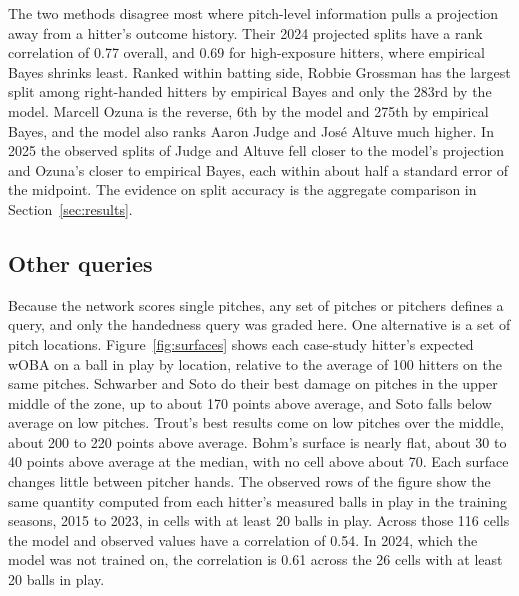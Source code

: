 \documentclass[11pt,letterpaper]{article}
\let\oldsubsection\subsection
\renewcommand\subsection{\FloatBarrier\oldsubsection}
\begin{document}
The two methods disagree most where pitch-level information pulls a projection away from a hitter's outcome history. Their 2024 projected splits have a rank correlation of 0.77 overall, and 0.69 for high-exposure hitters, where empirical Bayes shrinks least. Ranked within batting side, Robbie Grossman has the largest split among right-handed hitters by empirical Bayes and only the 283rd by the model. Marcell Ozuna is the reverse, 6th by the model and 275th by empirical Bayes, and the model also ranks Aaron Judge and José Altuve much higher. In 2025 the observed splits of Judge and Altuve fell closer to the model's projection and Ozuna's closer to empirical Bayes, each within about half a standard error of the midpoint. The evidence on split accuracy is the aggregate comparison in Section~\ref{sec:results}.

\subsection{Other queries}
\label{sec:otherqueries}

Because the network scores single pitches, any set of pitches or pitchers defines a query, and only the handedness query was graded here. One alternative is a set of pitch locations. Figure~\ref{fig:surfaces} shows each case-study hitter's expected wOBA on a ball in play by location, relative to the average of 100 hitters on the same pitches. Schwarber and Soto do their best damage on pitches in the upper middle of the zone, up to about 170 points above average, and Soto falls below average on low pitches. Trout's best results come on low pitches over the middle, about 200 to 220 points above average. Bohm's surface is nearly flat, about 30 to 40 points above average at the median, with no cell above about 70. Each surface changes little between pitcher hands. The observed rows of the figure show the same quantity computed from each hitter's measured balls in play in the training seasons, 2015 to 2023, in cells with at least 20 balls in play. Across those 116 cells the model and observed values have a correlation of 0.54. In 2024, which the model was not trained on, the correlation is 0.61 across the 26 cells with at least 20 balls in play.
\end{document}
